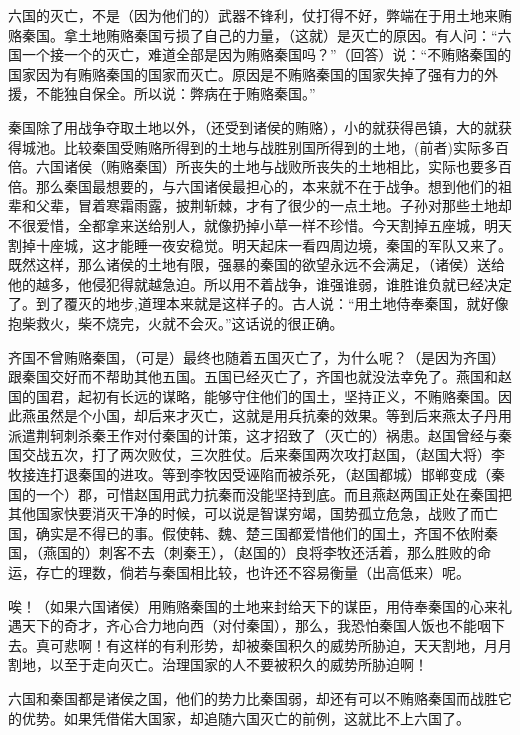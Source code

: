 \documentclass[12pt,UTF-8,openany,a4]{ctexbook}
\begin{document}
\begin{large}
    \yiwen 
    六国的灭亡，不是（因为他们的）武器不锋利，仗打得不好，弊端在于用土地来贿赂秦国。拿土地贿赂秦国亏损了自己的力量，（这就）是灭亡的原因。有人问：“六国一个接一个的灭亡，难道全部是因为贿赂秦国吗？”（回答）说：“不贿赂秦国的国家因为有贿赂秦国的国家而灭亡。原因是不贿赂秦国的国家失掉了强有力的外援，不能独自保全。所以说：弊病在于贿赂秦国。”
    
    秦国除了用战争夺取土地以外，（还受到诸侯的贿赂），小的就获得邑镇，大的就获得城池。比较秦国受贿赂所得到的土地与战胜别国所得到的土地，(前者)实际多百倍。六国诸侯（贿赂秦国）所丧失的土地与战败所丧失的土地相比，实际也要多百倍。那么秦国最想要的，与六国诸侯最担心的，本来就不在于战争。想到他们的祖辈和父辈，冒着寒霜雨露，披荆斩棘，才有了很少的一点土地。子孙对那些土地却不很爱惜，全都拿来送给别人，就像扔掉小草一样不珍惜。今天割掉五座城，明天割掉十座城，这才能睡一夜安稳觉。明天起床一看四周边境，秦国的军队又来了。既然这样，那么诸侯的土地有限，强暴的秦国的欲望永远不会满足，（诸侯）送给他的越多，他侵犯得就越急迫。所以用不着战争，谁强谁弱，谁胜谁负就已经决定了。到了覆灭的地步,道理本来就是这样子的。古人说：“用土地侍奉秦国，就好像抱柴救火，柴不烧完，火就不会灭。”这话说的很正确。
    
    齐国不曾贿赂秦国，（可是）最终也随着五国灭亡了，为什么呢？（是因为齐国）跟秦国交好而不帮助其他五国。五国已经灭亡了，齐国也就没法幸免了。燕国和赵国的国君，起初有长远的谋略，能够守住他们的国土，坚持正义，不贿赂秦国。因此燕虽然是个小国，却后来才灭亡，这就是用兵抗秦的效果。等到后来燕太子丹用派遣荆轲刺杀秦王作对付秦国的计策，这才招致了（灭亡的）祸患。赵国曾经与秦国交战五次，打了两次败仗，三次胜仗。后来秦国两次攻打赵国，（赵国大将）李牧接连打退秦国的进攻。等到李牧因受诬陷而被杀死，（赵国都城）邯郸变成（秦国的一个）郡，可惜赵国用武力抗秦而没能坚持到底。而且燕赵两国正处在秦国把其他国家快要消灭干净的时候，可以说是智谋穷竭，国势孤立危急，战败了而亡国，确实是不得已的事。假使韩、魏、楚三国都爱惜他们的国土，齐国不依附秦国，（燕国的）刺客不去（刺秦王），（赵国的）良将李牧还活着，那么胜败的命运，存亡的理数，倘若与秦国相比较，也许还不容易衡量（出高低来）呢。
    
    唉！（如果六国诸侯）用贿赂秦国的土地来封给天下的谋臣，用侍奉秦国的心来礼遇天下的奇才，齐心合力地向西（对付秦国），那么，我恐怕秦国人饭也不能咽下去。真可悲啊！有这样的有利形势，却被秦国积久的威势所胁迫，天天割地，月月割地，以至于走向灭亡。治理国家的人不要被积久的威势所胁迫啊！
    
    六国和秦国都是诸侯之国，他们的势力比秦国弱，却还有可以不贿赂秦国而战胜它的优势。如果凭借偌大国家，却追随六国灭亡的前例，这就比不上六国了。
    
\end{large}
\end{document}
